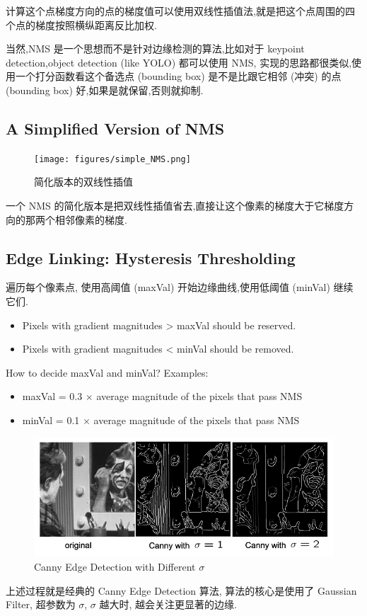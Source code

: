计算这个点梯度方向的点的梯度值可以使用双线性插值法,就是把这个点周围的四个点的梯度按照横纵距离反比加权.

当然,NMS 是一个思想而不是针对边缘检测的算法,比如对于 keypoint detection,object detection (like YOLO) 都可以使用 NMS,
实现的思路都很类似,使用一个打分函数看这个备选点 (bounding box) 是不是比跟它相邻 (冲突) 的点 (bounding box) 好,如果是就保留,否则就抑制.

\subsection{A Simplified Version of NMS}

\begin{figure}[htbp]
    \centering
	\texttt{[image: figures/simple\_NMS.png]}
	\caption{简化版本的双线性插值}
\end{figure}

一个 NMS 的简化版本是把双线性插值省去,直接让这个像素的梯度大于它梯度方向的那两个相邻像素的梯度.

\subsection{Edge Linking: Hysteresis Thresholding}
遍历每个像素点, 使用高阈值 (maxVal) 开始边缘曲线,使用低阈值 (minVal) 继续它们.

\begin{itemize}
    \item Pixels with gradient magnitudes > maxVal should be reserved.
    \item Pixels with gradient magnitudes < minVal should be removed.
\end{itemize}

How to decide maxVal and minVal? Examples:

\begin{itemize}
    \item maxVal = 0.3 $\times$ average magnitude of the pixels that pass NMS
    \item minVal = 0.1 $\times$ average magnitude of the pixels that pass NMS
\end{itemize}
\begin{figure}[htbp]
    \centering
    \includegraphics[scale=0.4]{figures/canny.png}
    \caption{Canny Edge Detection with Different $\sigma$}
\end{figure}
上述过程就是经典的 Canny Edge Detection 算法, 算法的核心是使用了 Gaussian Filter, 超参数为 $\sigma$, $\sigma$ 越大时, 越会关注更显著的边缘.
